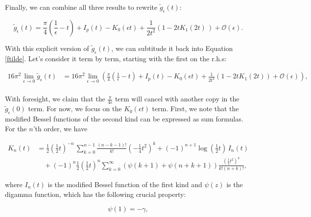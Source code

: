 \documentclass{article}
\numberwithin{equation}{section} %
\begin{document}
Finally, we can combine all three results to rewrite $\tilde{g}_\epsilon(t)$:

\begin{equation}
\tilde{g}_\epsilon(t) = \frac{\pi}{4}(\frac{1}{\epsilon}-t) + I_p(t) -  K_0(\epsilon t) + \frac{1}{2t^2}( 1 - 2tK_1(2t)\,) + \mathcal{O}(\epsilon).
\end{equation}

With this explicit version of $\tilde{g}_\epsilon(t)$, we can subtitude it back into Equation \ref{ftilde}. Let's consider it term by term, starting with the first on the r.h.s:

\begin{equation}
\begin{split}
16\pi^2\lim_{\epsilon \rightarrow 0} \tilde{g}_\epsilon(t) &= 16\pi^2 \lim_{\epsilon\rightarrow 0} \left( \frac{\pi}{4}(\frac{1}{\epsilon}-t) + I_p(t) - K_0(\epsilon t) + \frac{1}{2t^2}(1-2tK_1(2t)) + \mathcal{O}(\epsilon) \right),\\
\end{split}
\label{lim 1}
\end{equation}

\noindent With foresight, we claim that the $\frac{\pi}{4\epsilon}$ term will cancel with another copy in the $\tilde{g}_\epsilon(0)$ term. For now, we focus on the $K_0(\epsilon t)$ term. First, we note that the modified Bessel functions of the second kind can be expressed as sum formulas\cite{bessel}. For the $n$'th order, we have

\begin{equation}
\begin{split}
K_n(t) &= \frac{1}{2}\left(\frac{1}{2}t\right)^{-n} \, \sum^{n-1}_{k=0}\frac{(n-k-1)!}{k!}(-\frac{1}{4}t^2)^k + (-1)^{n+1} \log(\frac{1}{2}t)\, I_n(t) \\
& \quad + (-1)^n\frac{1}{2}\left(\frac{1}{2}t\right)^n\sum^\infty_{k=0}\left( \psi(k+1) + \psi(n+k+1) \right)\frac{(\frac{1}{4}t^2)^k}{k!(n+k)!},
\end{split}
\end{equation}

\noindent where $I_n(t)$ is the modified Bessel function of the first kind\cite{bessel1} and $\psi(z)$ is the digamma function\cite{digamma}, which has the following crucial property:

\begin{equation}
\psi(1) = -\gamma,
\end{equation}
\end{document}
